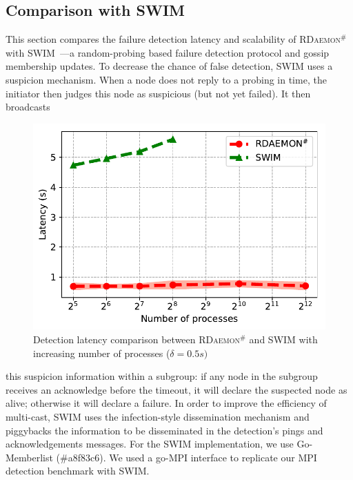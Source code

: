 \documentclass[sigconf]{acmart}
\newcommand{\mpi}[0]{\textsc{MPI}\xspace}
\newcommand{\ourwork}[0]{\textsc{RDaemon}\ensuremath{^\#}\xspace}
\begin{document}
\subsection{Comparison with SWIM}
This section compares the failure detection latency and scalability of \ourwork with SWIM~\cite{Abhinandan02}---a random-probing based failure detection protocol and gossip membership updates. To decrease
the chance of false detection, SWIM uses a suspicion mechanism. When a node does not reply to a probing in time, the initiator then judges this node as suspicious (but not yet failed). It then broadcasts
\begin{figure}[h]
  \centering
  \includegraphics[width=\linewidth]{Scale_prrte_swim.pdf}
  \caption{Detection latency comparison between \ourwork and SWIM with increasing number of processes ($\delta=0.5s)$}
  \label{fig:scale_swim}
\end{figure}
this suspicion information within a subgroup: if any node in the subgroup receives an acknowledge before the timeout, it will declare the suspected node as alive; otherwise it will declare a failure. In order to improve the efficiency of multi-cast, SWIM uses the infection-style dissemination mechanism and piggybacks the information to be disseminated in the detection's pings and acknowledgements messages.
For the SWIM implementation, we use Go-Memberlist (\#a8f83c6). We used a go-\mpi interface
to replicate our \mpi detection benchmark with SWIM.
\end{document}
